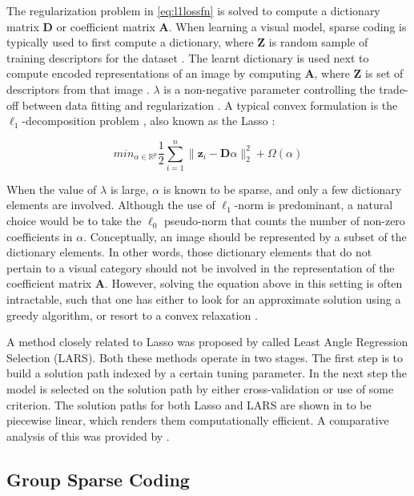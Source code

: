 The regularization problem in \cref{eq:l1lossfn} is solved to compute a dictionary matrix $\mathbf{D}$ or coefficient matrix $\mathbf{A}$. When learning a visual model, sparse coding is typically used to first compute a dictionary, where $\mathbf{Z}$ is random sample of training descriptors for the dataset \citep{Rigamonti2011, Donoho2003}. The learnt dictionary is used next to compute encoded representations of an image by computing $\mathbf{A}$, where $\mathbf{Z}$ is set of descriptors from that image \citep{Guillermo2010, Coates2011, Kreutz-Delgado2003a}. $\lambda$ is a non-negative parameter controlling the trade-off between data fitting and regularization \citep{Lee2009}. A typical convex formulation is the $\ell_{1}$-decomposition problem \citep{Donoho2003}, also known as the Lasso \citep{Tibshirani1994}:

\begin{equation}
 min_{\alpha \in \mathds{R}^{p}} \frac{1}{2} \sum_{i=1}^{n} \parallel \mathbf{z}_{i} - \mathbf{D} \alpha \parallel^{2}_{2} + \Omega(\alpha)
\end{equation}

When the value of $\lambda$ is large, $\alpha$ is known to be sparse, and only a few dictionary elements are involved. Although the use of $\ell_{1}$-norm is predominant, a natural choice would be to take the $\ell_{0}$ pseudo-norm that counts the number of non-zero coefficients in $\alpha$. Conceptually, an image should be represented by a subset of the dictionary elements. In other words, those dictionary elements that do not pertain to a visual category should not be involved in the representation of the coefficient matrix $\mathbf{A}$. However, solving the equation above in this setting is often intractable, such that one has either to look for an approximate solution using a greedy algorithm, or resort to a convex relaxation \citep{Gregor2010}.

A method closely related to Lasso was proposed by \citet{Efron2004} called Least Angle Regression Selection (LARS). Both these methods operate in two stages. The first step is to build a solution path indexed by a certain tuning parameter. In the next step the model is selected on the solution path by either cross-validation or use of some criterion. The solution paths for both Lasso and LARS are shown in \citep{Efron2004} to be piecewise linear, which renders them computationally efficient. A comparative analysis of this was provided by \citet{Rosset2007}. 

\subsection[Group Sparse Coding]{Group Sparse Coding}
\label{ch_groupsparse_groupsparsecoding}


